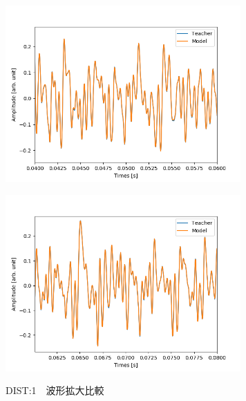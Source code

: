 \documentclass{jreport}		%
\begin{document}
\begin{figure}[htbp]
 \begin{minipage}{0.5\hsize}
 \begin{center}
  \includegraphics[width=90mm]{gain1_output_hikaku3.png}
 \end{center}
 \label{fig:one}
 \end{minipage}
 \begin{minipage}{0.5\hsize}
 \begin{center}
  \includegraphics[width=90mm]{gain1_output_hikaku4.png}
 \end{center}
 \label{fig:two}
 \end{minipage}
 \caption{DIST:1　波形拡大比較}
\end{figure}
\end{document}
